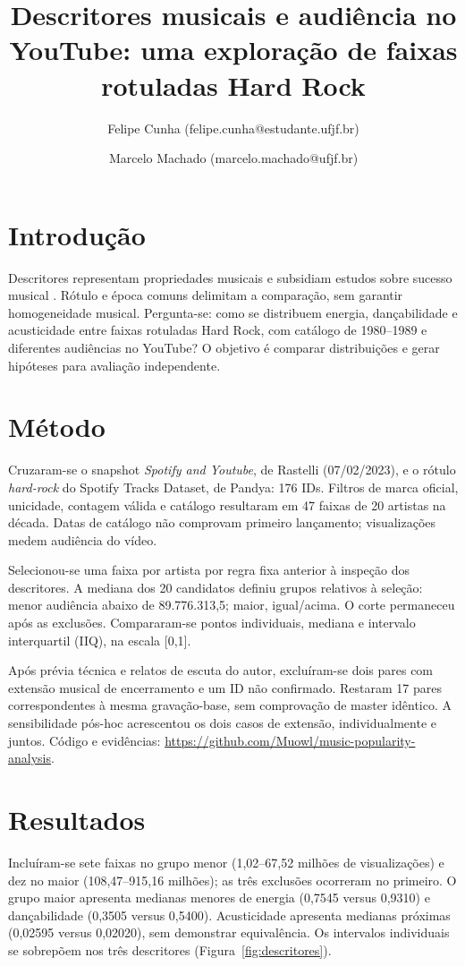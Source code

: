 \documentclass[twocolumn]{article}
\begin{document}
\title{Descritores musicais e audiência no YouTube: uma exploração de faixas rotuladas Hard Rock}
\author{Felipe Cunha (felipe.cunha@estudante.ufjf.br)}
\author{Marcelo Machado (marcelo.machado@ufjf.br)}
\maketitle

\section*{Introdução}
Descritores representam propriedades musicais \cite{schedl2014mir} e subsidiam estudos sobre sucesso musical \cite{askin2017popular}. Rótulo e época comuns delimitam a comparação, sem garantir homogeneidade musical. Pergunta-se: como se distribuem energia, dançabilidade e acusticidade entre faixas rotuladas Hard Rock, com catálogo de 1980--1989 e diferentes audiências no YouTube? O objetivo é comparar distribuições e gerar hipóteses para avaliação independente.

\section*{Método}
Cruzaram-se o snapshot \textit{Spotify and Youtube}, de Rastelli (07/02/2023), e o rótulo \textit{hard-rock} do Spotify Tracks Dataset, de Pandya: 176 IDs. Filtros de marca oficial, unicidade, contagem válida e catálogo resultaram em 47 faixas de 20 artistas na década. Datas de catálogo não comprovam primeiro lançamento; visualizações medem audiência do vídeo.

Selecionou-se uma faixa por artista por regra fixa anterior à inspeção dos descritores. A mediana dos 20 candidatos definiu grupos relativos à seleção: menor audiência abaixo de 89.776.313,5; maior, igual/acima. O corte permaneceu após as exclusões. Compararam-se pontos individuais, mediana e intervalo interquartil (IIQ), na escala [0,1].

Após prévia técnica e relatos de escuta do autor, excluíram-se dois pares com extensão musical de encerramento e um ID não confirmado. Restaram 17 pares correspondentes à mesma gravação-base, sem comprovação de master idêntico. A sensibilidade pós-hoc acrescentou os dois casos de extensão, individualmente e juntos. Código e evidências: \url{https://github.com/Muowl/music-popularity-analysis}.

\section*{Resultados}
Incluíram-se sete faixas no grupo menor (1,02--67,52 milhões de visualizações) e dez no maior (108,47--915,16 milhões); as três exclusões ocorreram no primeiro. O grupo maior apresenta medianas menores de energia (0,7545 versus 0,9310) e dançabilidade (0,3505 versus 0,5400). Acusticidade apresenta medianas próximas (0,02595 versus 0,02020), sem demonstrar equivalência. Os intervalos individuais se sobrepõem nos três descritores (Figura~\ref{fig:descritores}).
\end{document}
